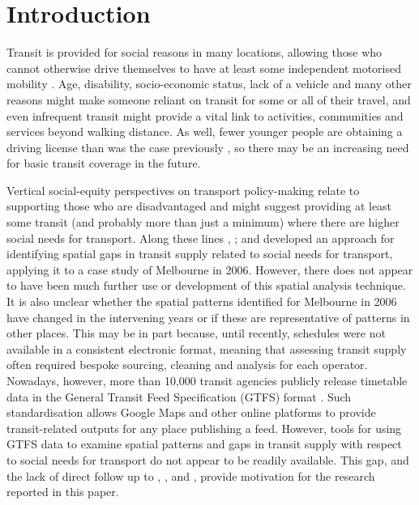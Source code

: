 \documentclass[preprint, 3p,
authoryear]{elsarticle} %
\begin{document}
\section{Introduction}\label{introduction}

Transit is provided for social reasons in many locations, allowing those
who cannot otherwise drive themselves to have at least some independent
motorised mobility \citep{Currie:2016aa}. Age, disability,
socio-economic status, lack of a vehicle and many other reasons might
make someone reliant on transit for some or all of their travel, and
even infrequent transit might provide a vital link to activities,
communities and services beyond walking distance. As well, fewer younger
people are obtaining a driving license than was the case previously
\citep{delbosc2013causes}, so there may be an increasing need for basic
transit coverage in the future.

Vertical social-equity perspectives on transport policy-making relate to
supporting those who are disadvantaged \citep{Litman:2016aa} and might
suggest providing at least some transit (and probably more than just a
minimum) where there are higher social needs for transport. Along these
lines \citet{Currie2003Hobart}, \citet{Currie2004Gap};
\citet{Currie2007Identifying} and \citet{currie2010identifying}
developed an approach for identifying spatial gaps in transit supply
related to social needs for transport, applying it to a case study of
Melbourne in 2006. However, there does not appear to have been much
further use or development of this spatial analysis technique. It is
also unclear whether the spatial patterns identified for Melbourne in
2006 have changed in the intervening years or if these are
representative of patterns in other places. This may be in part because,
until recently, schedules were not available in a consistent electronic
format, meaning that assessing transit supply often required bespoke
sourcing, cleaning and analysis for each operator. Nowadays, however,
more than 10,000 transit agencies publicly release timetable data in the
General Transit Feed Specification (GTFS) format \citep{GTFS}. Such
standardisation allows Google Maps and other online platforms to provide
transit-related outputs for any place publishing a feed. However, tools
for using GTFS data to examine spatial patterns and gaps in transit
supply with respect to social needs for transport do not appear to be
readily available. This gap, and the lack of direct follow up to
\citet{Currie2003Hobart}, \citet{Currie2004Gap},
\citet{Currie2007Identifying} and \citet{currie2010identifying}, provide
motivation for the research reported in this paper.
\end{document}
